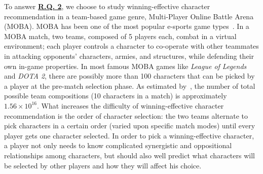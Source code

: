 To answer \hyperref[rq2]{\textbf{R.Q. 2}}, we choose to study winning-effective character recommendation in a team-based game genre, Multi-Player Online Battle Arena (MOBA). MOBA has been one of the most popular e-sports game types~\cite{superdata2016}. In a MOBA match, two teams, composed of 5 players each, combat in a virtual environment; each player controls a character to co-operate with other teammates in attacking opponents' characters, armies, and structures, while defending their own in-game properties. In most famous MOBA games like \textit{League of Legends} and \textit{DOTA 2}, there are possibly more than 100 characters that can be picked by a player at the pre-match selection phase. As estimated by~\cite{hanke2017reco}, the number of total possible team compositions (10 characters in a match) is approximately $1.56 \times 10^{16}$. What increases the difficulty of winning-effective character recommendation is the order of character selection: the two teams alternate to pick characters in a certain order (varied upon specific match modes) until every player gets one character selected. In order to pick a winning-effective character, a player not only needs to know complicated synergistic and oppositional relationships among characters, but should also well predict what characters will be selected by other players and how they will affect his choice. 




